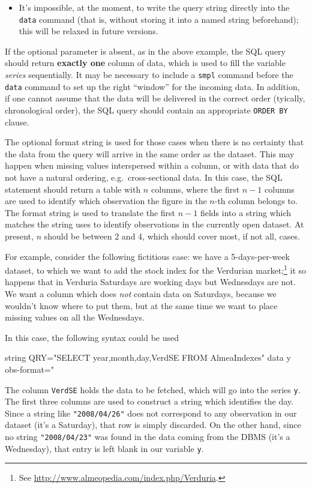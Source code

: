 \begin{itemize}
  \item It's impossible, at the moment, to write the query string
    directly into the \texttt{data} command (that is, without storing
    it into a named string beforehand); this will be relaxed in future
    versions.
\end{itemize}

If the optional parameter is absent, as in the above example, the SQL
query should return \textbf{exactly one} column of data, which is used
to fill the variable \emph{series} sequentially.  It may be necessary
to include a \texttt{smpl} command before the \texttt{data} command to
set up the right ``window'' for the incoming data.  In addition, if
one cannot assume that the data will be delivered in the correct order
(tyically, chronological order), the SQL query should contain an
appropriate \texttt{ORDER BY} clause.

The optional format string is used for those cases when there is no
certainty that the data from the query will arrive in the same order
as the  dataset. This may happen when missing
values interspersed within a column, or with data that do not have a
natural ordering, e.g.\ cross-sectional data. In this case,
the SQL statement should return a table with $n$ columns, where the
first $n-1$ columns are used to identify which observation the figure
in the $n$-th column belongs to. The format string is used to
translate the first $n-1$ fields into a string which matches the
string  uses to identify observations in the currently open
dataset. At present, $n$ should be between 2 and 4, which should cover
most, if not all, cases.

For example, consider the following fictitious case: we have a
5-days-per-week dataset, to which we want to add the stock index for
the Verdurian market;\footnote{See
  \url{http://www.almeopedia.com/index.php/Verduria}.} it so
happens that in Verduria Saturdays are working days but Wednesdays are
not. We want a column which does \emph{not} contain data on
Saturdays, because we wouldn't know where to put them, but at the same
time we want to place missing values on all the Wednesdays.

In this case, the following syntax could be used
%
\begin{code}
  string QRY="SELECT year,month,day,VerdSE FROM AlmeaIndexes"
  data y obs-format="%
\end{code}
%
The column \texttt{VerdSE} holds the data to be fetched, which will go
into the  series \texttt{y}. The first three columns are
used to construct a string which identifies the day. Since a string
like \texttt{"2008/04/26"} does not correspond to any observation in
our dataset (it's a Saturday), that row is simply discarded. On the
other hand, since no string \texttt{"2008/04/23"} was found in the
data coming from the DBMS (it's a Wednesday), that entry is left blank
in our variable \texttt{y}.

